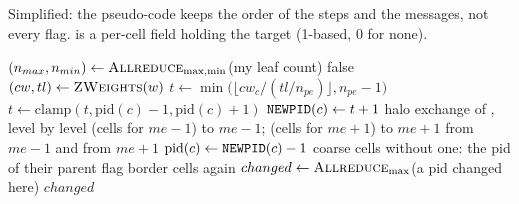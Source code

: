 Simplified: the pseudo-code keeps the order of the steps and the
messages, not every flag.  is a per-cell field holding the
target (1-based, 0 for none).

\begin{algorithm}[H]
  \caption{: balance by repeated passes}
  \label{alg:bas-update}
  \begin{algorithmic}[1]
    \State {}
     
    \EndWhile
  \end{algorithmic}
\end{algorithm}

\begin{algorithm}[H]
  \caption{\textsc{Balance}$(w)$ (): one pass, cells to
    $\mathrm{pid} \pm 1$}
  \label{alg:bas-balance}
  \begin{algorithmic}[1]
    \State $(n_{max}, n_{min}) \gets \textsc{Allreduce}_{\max,\min}$(my
      leaf count)
      \State \Return false
    \EndIf
    \State $(cw, tl) \gets \textsc{ZWeights}(w)$
      \State $t \gets \min\big(\lfloor cw_c / (tl / n_{pe}) \rfloor, n_{pe} - 1\big)$
      \State $t \gets \mathrm{clamp}(t, \mathrm{pid}(c) - 1, \mathrm{pid}(c)
        + 1)$
       \State $\texttt{NEWPID}(c) \gets t + 1$ \EndIf
    \EndFor
    \State halo exchange of , level by level
    \State {} (cells for $me - 1$) to $me - 1$;\;
       (cells for $me + 1$) to $me + 1$
    \State {} from $me - 1$ and from $me + 1$
     \State $\mathrm{pid}(c) \gets
      \texttt{NEWPID}(c) - 1$ \EndFor
    \State coarse cells without one: the pid of their parent
    \State flag border cells again
    \State $changed \gets \textsc{Allreduce}_{\max}$(a pid changed here)
     \State {} \EndIf
    \State \Return $changed$
  \end{algorithmic}
\end{algorithm}

